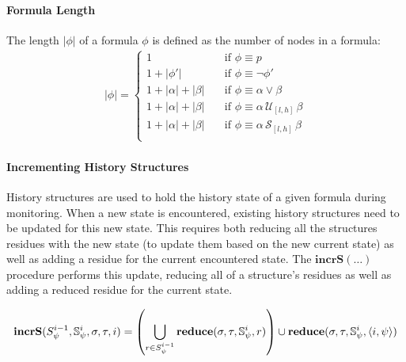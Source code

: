 \paragraph{Formula Length}
The length $|\phi|$ of a formula $\phi$ is defined as the number of nodes in a formula: 
\begin{align*}
|\phi| = \left\lbrace
\begin{aligned}
1 & \quad \text{if } \phi \equiv p \\
1 + |\phi'| & \quad \text{if } \phi \equiv \neg \phi' \\
1 + |\alpha| + |\beta| & \quad \text{if } \phi \equiv \alpha \vee \beta \\
1 + |\alpha| + |\beta| & \quad \text{if } \phi \equiv \alpha\, \mathcal{U}_{[l,h]}\, \beta \\
1 + |\alpha| + |\beta| & \quad \text{if } \phi \equiv \alpha\, \mathcal{S}_{[l,h]}\, \beta \\
\end{aligned} \right.
\end{align*}



\paragraph{Incrementing History Structures}
History structures are used to hold the history state of a given formula during monitoring.
When a new state is encountered, existing history structures need to be updated for this new state. This requires both reducing all the structures residues with the new state (to update them based on the new current state) as well as adding a residue for the current encountered state. The $\mathbf{incrS}(\dots)$ procedure performs this update, reducing all of a structure's residues as well as adding a reduced residue for the current state.

\begin{align*}
\mathbf{incrS}(S^{i-1}_\psi, \mathbb{S}^i_{\psi}, \sigma, \tau, i) = %
\left(\bigcup\limits_{r \in S^{i-1}_{\psi}} \mathbf{reduce}(\sigma, \tau, \mathbb{S}^i_{\psi}, r)\right) \cup \mathbf{reduce}(\sigma, \tau, \mathbb{S}^i_{\psi}, \rp{i}{\psi})
\end{align*}


